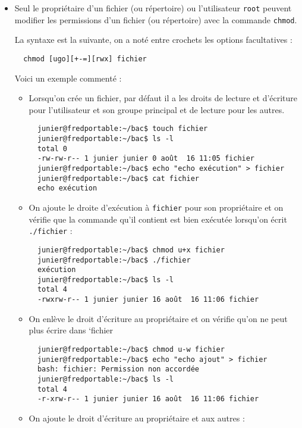 \documentclass[
  11pt,
]{article}
\newcounter{prop}
\begin{document}
\begin{itemize}
\item
  Seul le propriétaire d'un fichier (ou répertoire) ou l'utilisateur
  \texttt{root} peuvent modifier les permissions d'un fichier (ou
  répertoire) avec la commande \texttt{chmod}.

  La syntaxe est la suivante, on a noté entre crochets les options
  facultatives :

\begin{verbatim}
  chmod [ugo][+-=][rwx] fichier
\end{verbatim}

  Voici un exemple commenté :

  \begin{itemize}
  \item
    Lorsqu'on crée un fichier, par défaut il a les droits de lecture et
    d'écriture pour l'utilisateur et son groupe principal et de lecture
    pour les autres.

\begin{verbatim}
  junier@fredportable:~/bac$ touch fichier
  junier@fredportable:~/bac$ ls -l
  total 0
  -rw-rw-r-- 1 junier junier 0 août  16 11:05 fichier
  junier@fredportable:~/bac$ echo "echo exécution" > fichier
  junier@fredportable:~/bac$ cat fichier 
  echo exécution
\end{verbatim}
  \item
    On ajoute le droite d'exécution à \texttt{fichier} pour son
    propriétaire et on vérifie que la commande qu'il contient est bien
    exécutée lorsqu'on écrit \texttt{./fichier} :

\begin{verbatim}
  junier@fredportable:~/bac$ chmod u+x fichier
  junier@fredportable:~/bac$ ./fichier 
  exécution
  junier@fredportable:~/bac$ ls -l
  total 4
  -rwxrw-r-- 1 junier junier 16 août  16 11:06 fichier
\end{verbatim}
  \item
    On enlève le droit d'écriture au propriétaire et on vérifie qu'on ne
    peut plus écrire dans `fichier

\begin{verbatim}
  junier@fredportable:~/bac$ chmod u-w fichier 
  junier@fredportable:~/bac$ echo "echo ajout" > fichier
  bash: fichier: Permission non accordée
  junier@fredportable:~/bac$ ls -l
  total 4
  -r-xrw-r-- 1 junier junier 16 août  16 11:06 fichier
\end{verbatim}
  \item
    On ajoute le droit d'écriture au propriétaire et aux autres :


\end{itemize}
\end{itemize}
\end{document}
